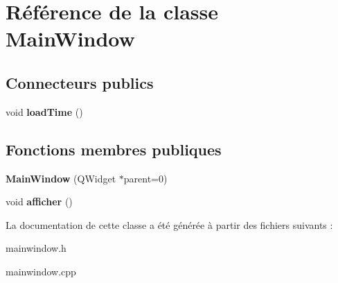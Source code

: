 \hypertarget{classMainWindow}{
\section{Référence de la classe MainWindow}
\label{classMainWindow}
}
\subsection*{Connecteurs publics}
\begin{DoxyCompactItemize}
\item 
\hypertarget{classMainWindow_af676b5cca5c8975dd3d7d12d70e5ebad}{
void {\bfseries loadTime} ()}
\label{classMainWindow_af676b5cca5c8975dd3d7d12d70e5ebad}

\end{DoxyCompactItemize}
\subsection*{Fonctions membres publiques}
\begin{DoxyCompactItemize}
\item 
\hypertarget{classMainWindow_a8b244be8b7b7db1b08de2a2acb9409db}{
{\bfseries MainWindow} (QWidget $\ast$parent=0)}
\label{classMainWindow_a8b244be8b7b7db1b08de2a2acb9409db}

\item 
\hypertarget{classMainWindow_a37c0b44e6dacc12f4136f4db3ac0cdeb}{
void {\bfseries afficher} ()}
\label{classMainWindow_a37c0b44e6dacc12f4136f4db3ac0cdeb}

\end{DoxyCompactItemize}


La documentation de cette classe a été générée à partir des fichiers suivants :\begin{DoxyCompactItemize}
\item 
mainwindow.h\item 
mainwindow.cpp\end{DoxyCompactItemize}
